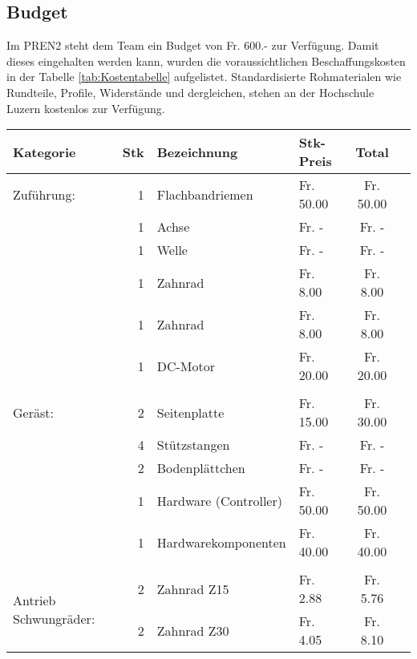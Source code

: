 \subsection{Budget}
	Im PREN2 steht dem Team ein Budget von Fr. 600.- zur Verfügung. Damit 
	dieses eingehalten werden kann, wurden die voraussichtlichen 
	Beschaffungskosten in der Tabelle \ref{tab:Kostentabelle} aufgelistet. 
	Standardisierte Rohmaterialen wie Rundteile, Profile, Widerstände und 
	dergleichen, stehen an der Hochschule Luzern kostenlos zur Verfügung.
    \begin{longtable}{p{1.7cm}rllcc}
    \textbf{Kategorie} & \textbf{Stk} & \textbf{Bezeichnung} & \textbf{Stk-Preis}
    & \textbf{Total} \\
    \hline Zuführung: & 1     & Flachbandriemen 	          &  Fr. 50.00 &  Fr. 50.00 \\
               & 1     & Achse          	          &  Fr. -     &  Fr. -     \\
               & 1     & Welle                     	  &  Fr. -     &  Fr. -     \\
               & 1     & Zahnrad         	          &  Fr. 8.00  &  Fr. 8.00  \\
               & 1     & Zahnrad         	          &  Fr. 8.00  &  Fr. 8.00  \\
               & 1     & DC-Motor        	          &  Fr. 20.00 &  Fr. 20.00 \\
               &       &                 	          &            &            \\
       Geräst: & 2     & Seitenplatte    	          &  Fr. 15.00 &  Fr. 30.00 \\
               & 4     & Stützstangen    	          &  Fr. -     &  Fr. -     \\
               & 2     & Bodenplättchen  	          &  Fr. -     &  Fr. -     \\
               & 1     & Hardware (Controller)        &  Fr. 50.00 &  Fr. 50.00 \\
               & 1     & Hardwarekomponenten          &  Fr. 40.00 &  Fr. 40.00 \\
               &       &       				          &      	   &            \\
   \multirow{3}{1.7cm}{Antrieb Schwungräder:}  
               & 2     & Zahnrad Z15                  &  Fr. 2.88  &  Fr. 5.76  \\
               & 2     & Zahnrad Z30 	              &  Fr. 4.05  &  Fr. 8.10  \\

\end{longtable}
